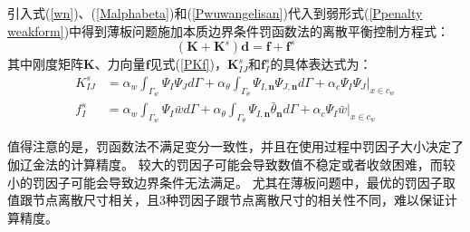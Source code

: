 引入式(\ref{wn})、(\ref{Malphabeta})和(\ref{Pwuwangelisan})代入到弱形式(\ref{Ppenalty weakform})中得到薄板问题施加本质边界条件罚函数法的离散平衡控制方程式：
\begin{equation}
    (\pmb{K}+\pmb{K}^s)\pmb{d}=\pmb{f}+\pmb{f}^s
\end{equation}
其中刚度矩阵$\pmb{K}$、力向量$\pmb{f}$见式(\ref{PKf})，$\pmb K^s_{IJ}$和$\pmb f^s_I$的具体表达式为：
\begin{subequations}\label{PKFs}
\begin{align}
   K^s_{IJ}&=\alpha_w\int_{\Gamma_w}\Psi_I\Psi_Jd\Gamma+\alpha_{\theta}\int_{\Gamma_{\theta}}\Psi_{I,\pmb n}\Psi_{J,\pmb n}d\Gamma+\alpha_c\Psi_I\Psi_J\vert_{x\in c_w}\\
f^s_I&=\alpha_w\int_{\Gamma_w}\Psi_I\bar{w}d\Gamma+\alpha_{\theta}\int_{\Gamma_{\theta}}\Psi_{I,\pmb n}\bar{\theta}_{\pmb n}d\Gamma+\alpha_c\Psi_I\bar{w}\vert_{x\in c_w}
\end{align}
\end{subequations}\par
值得注意的是，罚函数法不满足变分一致性，并且在使用过程中罚因子大小决定了伽辽金法的计算精度。
较大的罚因子可能会导致数值不稳定或者收敛困难，而较小的罚因子可能会导致边界条件无法满足。
尤其在薄板问题中，最优的罚因子取值跟节点离散尺寸相关，且3种罚因子跟节点离散尺寸的相关性不同，难以保证计算精度。
